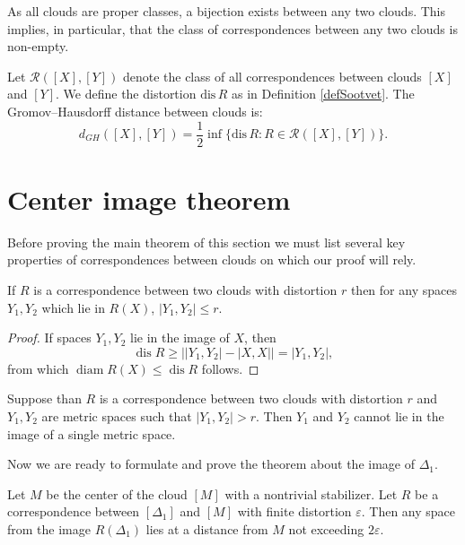 \documentclass[leqno]{article}
\begin{document}
\begin{remark}
  As all clouds are proper classes, a bijection exists between any
  two clouds. This implies, in particular, that the class of
  correspondences between any two clouds is non-empty.
\end{remark}

\begin{defin}
  Let $\mathcal{R}([X],[Y])$ denote the class of all correspondences
  between clouds $[X]$ and $[Y]$. We define the distortion
  $\text{dis}\, R$ as in Definition \ref{defSootvet}. The
  Gromov--Hausdorff distance between clouds is:
  $$
  d_{GH}([X],[Y]) = \frac{1}{2}\inf\{\text{dis}\, R : R \in
  \mathcal{R}([X],[Y])\}.
  $$
\end{defin}

\section{Center image theorem}

Before proving the main theorem of this section we must list several
key properties of correspondences between clouds on which our proof will rely.
\begin{lemma}\label{lemDiamImage}
  If $R$ is a correspondence between two clouds with distortion $r$
  then for any spaces $Y_1,Y_2$ which lie in $R(X)$, $|Y_1,Y_2| \le r$.
\end{lemma}

\begin{proof}
  If spaces $Y_{1}, Y_{2}$ lie in the image of $X$, then
  $$
  \operatorname{dis} R \geq \big|\left|Y_{1},Y_{2}\right| -
  \left|X,X\right|\big| = |Y_{1}, Y_{2}|,
  $$
  from which $\operatorname{diam} R(X) \leq \operatorname{dis} R$ follows.
\end{proof}

\begin{corollary}
  Suppose than $R$ is a correspondence between two clouds with
  distortion $r$ and $Y_1,Y_2$ are metric spaces such that $|Y_1,Y_2|
  > r$. Then $Y_1$ and $Y_2$ cannot lie in the image of a single metric space.
\end{corollary}
Now we are ready to formulate and prove the theorem about the image
of $\Delta_1$.
\begin{theorem}\label{thrmCenterImage}
  Let $M$ be the center of the cloud $[M]$ with a nontrivial
  stabilizer. Let $R$ be a correspondence between $[\Delta_{1}]$ and
  $[M]$ with finite distortion $\varepsilon$. Then any space from the
  image $R(\Delta_{1})$ lies at a distance from $M$ not exceeding
  $2\varepsilon$.
\end{theorem}
\end{document}
